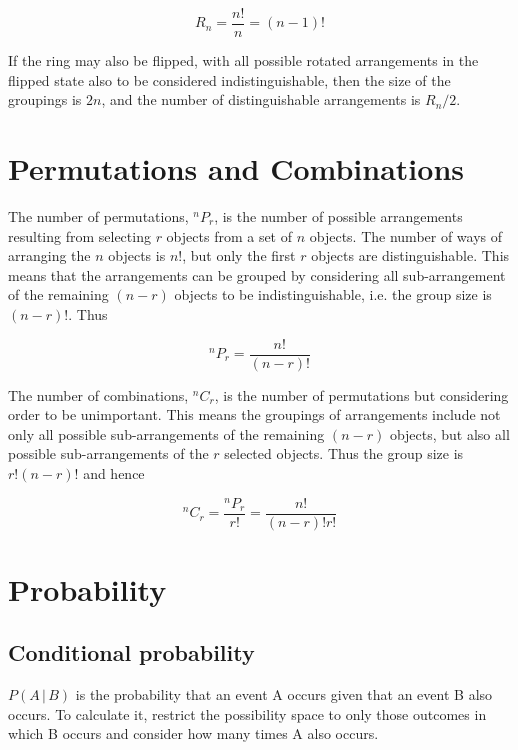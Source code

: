 \documentclass[a5paper]{article}
\begin{document}
\begin{equation}
  R_n = \frac{n!}{n} = (n-1)!
\end{equation}

If the ring may also be flipped, with all possible rotated arrangements in the
flipped state also to be considered indistinguishable, then the size of the
groupings is $2n$, and the number of distinguishable arrangements is $R_n / 2$.

\section{Permutations and Combinations}

The number of permutations, ${}^nP_r$, is the number of possible arrangements
resulting from selecting $r$ objects from a set of $n$ objects. The number of
ways of arranging the $n$ objects is $n!$, but only the first $r$ objects are
distinguishable. This means that the arrangements can be grouped by
considering all sub-arrangement of the remaining $(n-r)$ objects to be
indistinguishable, i.e. the group size is $(n-r)!$. Thus

\begin{equation}
  {}^nP_r = \frac{n!}{(n-r)!}
\end{equation}

The number of combinations, ${}^nC_r$, is the number of permutations but
considering order to be unimportant. This means the groupings of arrangements
include not only all possible sub-arrangements of the remaining $(n-r)$ objects,
but also all possible sub-arrangements of the $r$ selected objects. Thus the
group size is $r!(n-r)!$ and hence

\begin{equation}
  {}^nC_r = \frac{{}^nP_r}{r!} = \frac{n!}{(n-r)!r!}
\end{equation}

\section{Probability}
\subsection{Conditional probability}

$P(A\,|\,B)$ is the probability that an event A occurs given that an event B also
occurs. To calculate it, restrict the possibility space to only those outcomes
in which B occurs and consider how many times A also occurs.
\end{document}
